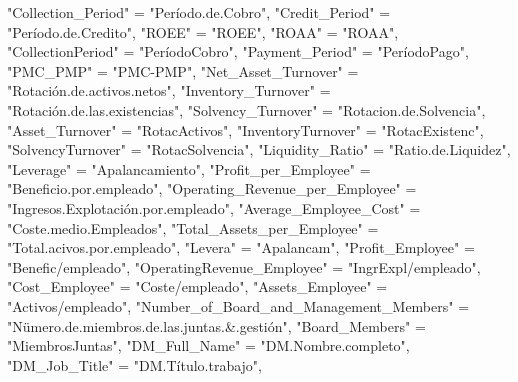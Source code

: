 \documentclass[
]{article}
\newenvironment{Shaded}{\begin{snugshade}}{\end{snugshade}}
\newcommand{\NormalTok}[1]{#1}
\newcommand{\OtherTok}[1]{\textcolor[rgb]{0.56,0.35,0.01}{#1}}
\newcommand{\StringTok}[1]{\textcolor[rgb]{0.31,0.60,0.02}{#1}}
\begin{document}
\begin{Shaded}
\begin{Highlighting}[]
    \StringTok{"Collection\_Period"} \OtherTok{=} \StringTok{"Período.de.Cobro"}\NormalTok{,}
    \StringTok{"Credit\_Period"} \OtherTok{=} \StringTok{"Período.de.Credito"}\NormalTok{,}
    \StringTok{"ROEE"} \OtherTok{=} \StringTok{"ROEE"}\NormalTok{,}
    \StringTok{"ROAA"} \OtherTok{=} \StringTok{"ROAA"}\NormalTok{,}
    \StringTok{"CollectionPeriod"} \OtherTok{=} \StringTok{"PeríodoCobro"}\NormalTok{,}
    \StringTok{"Payment\_Period"} \OtherTok{=} \StringTok{"PeríodoPago"}\NormalTok{,}
    \StringTok{"PMC\_PMP"} \OtherTok{=} \StringTok{"PMC{-}PMP"}\NormalTok{,}
    \StringTok{"Net\_Asset\_Turnover"} \OtherTok{=} \StringTok{"Rotación.de.activos.netos"}\NormalTok{,}
    \StringTok{"Inventory\_Turnover"} \OtherTok{=} \StringTok{"Rotación.de.las.existencias"}\NormalTok{,}
    \StringTok{"Solvency\_Turnover"} \OtherTok{=} \StringTok{"Rotacion.de.Solvencia"}\NormalTok{,}
    \StringTok{"Asset\_Turnover"} \OtherTok{=} \StringTok{"RotacActivos"}\NormalTok{,}
    \StringTok{"InventoryTurnover"} \OtherTok{=} \StringTok{"RotacExistenc"}\NormalTok{,}
    \StringTok{"SolvencyTurnover"} \OtherTok{=} \StringTok{"RotacSolvencia"}\NormalTok{,}
    \StringTok{"Liquidity\_Ratio"} \OtherTok{=} \StringTok{"Ratio.de.Liquidez"}\NormalTok{,}
    \StringTok{"Leverage"} \OtherTok{=} \StringTok{"Apalancamiento"}\NormalTok{,}
    \StringTok{"Profit\_per\_Employee"} \OtherTok{=} \StringTok{"Beneficio.por.empleado"}\NormalTok{,}
    \StringTok{"Operating\_Revenue\_per\_Employee"} \OtherTok{=} \StringTok{"Ingresos.Explotación.por.empleado"}\NormalTok{,}
    \StringTok{"Average\_Employee\_Cost"} \OtherTok{=} \StringTok{"Coste.medio.Empleados"}\NormalTok{,}
    \StringTok{"Total\_Assets\_per\_Employee"} \OtherTok{=} \StringTok{"Total.acivos.por.empleado"}\NormalTok{,}
    \StringTok{"Levera"} \OtherTok{=} \StringTok{"Apalancam"}\NormalTok{,}
    \StringTok{"Profit\_Employee"} \OtherTok{=} \StringTok{"Benefic/empleado"}\NormalTok{,}
    \StringTok{"OperatingRevenue\_Employee"} \OtherTok{=} \StringTok{"IngrExpl/empleado"}\NormalTok{,}
    \StringTok{"Cost\_Employee"} \OtherTok{=} \StringTok{"Coste/empleado"}\NormalTok{,}
    \StringTok{"Assets\_Employee"} \OtherTok{=} \StringTok{"Activos/empleado"}\NormalTok{,}
    \StringTok{"Number\_of\_Board\_and\_Management\_Members"} \OtherTok{=} 
      \StringTok{"Nümero.de.miembros.de.las.juntas.\&.gestión"}\NormalTok{,}
    \StringTok{"Board\_Members"} \OtherTok{=} \StringTok{"MiembrosJuntas"}\NormalTok{,}
    \StringTok{"DM\_Full\_Name"} \OtherTok{=} \StringTok{"DM.Nombre.completo"}\NormalTok{,}
    \StringTok{"DM\_Job\_Title"} \OtherTok{=} \StringTok{"DM.Título.trabajo"}\NormalTok{,}

\end{Highlighting}
\end{Shaded}
\end{document}
